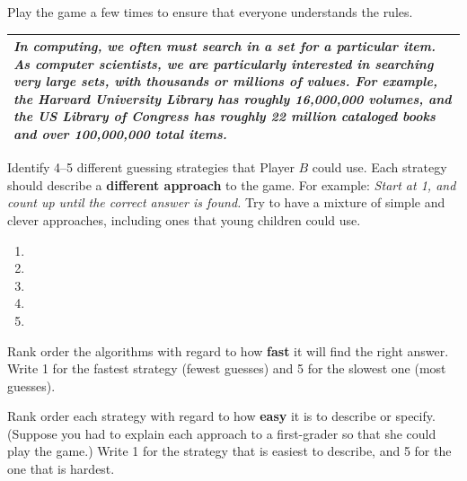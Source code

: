 \begin{answer}[2em]
\end{answer}


\Q Play the game a few times to ensure that everyone understands the rules.

\vspace{1ex}

\begin{center}
\begin{tabularx}{\linewidth}{|X|}
\hline
\it
In computing, we often must search in a set for a particular item.
As computer scientists, we are particularly interested in searching very large sets, with thousands or millions of values.
For example, the Harvard University Library has roughly 16,000,000 volumes, and the US Library of Congress has roughly 22 million cataloged books and over 100,000,000 total items.
\\
\hline
\end{tabularx}
\end{center}


\Q Identify 4--5 different guessing strategies that Player $B$ could use.
Each strategy should describe a \textbf{different approach} to the game.
For example: \textit{Start at 1, and count up until the correct answer is found.}
Try to have a mixture of simple and clever approaches, including ones that young children could use.

\begin{enumerate}
\item 
\item 
\item 
\item 
\item 
\end{enumerate}


\Q Rank order the algorithms with regard to how \textbf{fast} it will find the right answer.
Write 1 for the fastest strategy (fewest guesses) and 5 for the slowest one (most guesses).

\begin{answer}
\end{answer}


\Q Rank order each strategy with regard to how \textbf{easy} it is to describe or specify.
(Suppose you had to explain each approach to a first-grader so that she could play the game.)
Write 1 for the strategy that is easiest to describe, and 5 for the one that is hardest.

\begin{answer}
\end{answer}


